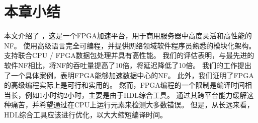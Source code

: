 \section{本章小结}
\label{clicknp:sec:conclusion}

本文介绍了 \name ，这是一个FPGA加速平台，用于商用服务器中高度灵活和高性能的NF。
\name 使用高级语言完全可编程，并提供网络领域软件程序员熟悉的模块化架构。
\name 支持联合CPU / FPGA数据包处理并具有高性能。
我们的评估表明，与最先进的软件NF相比，\name 将NF的吞吐量提高了10倍，将延迟降低了10倍。
我们的工作提出了一个具体案例，表明FPGA能够加速数据中心的NF。
此外，我们证明了FPGA的高级编程实际上是可行和实用的。
然而，FPGA编程的一个限制是编译时间相当长，例如1小时约2小时，主要是由于HDL综合工具。
\name 通过其跨平台能力缓解这种痛苦，并希望通过在CPU上运行元素来检测大多数错误。
但是，从长远来看，HDL综合工具应该进行优化，以大大缩短编译时间。





